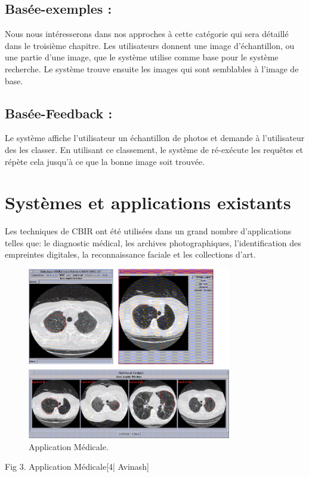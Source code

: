 \subsection{Basée-exemples :} Nous nous intéresserons dans nos approches à cette catégorie qui sera détaillé dans le troisième chapitre. Les utilisateurs donnent une image d'échantillon, ou une partie d'une image, que le système utilise comme base pour le système recherche. Le système trouve ensuite les images qui sont semblables à l'image de base.

\subsection{Basée-Feedback :} Le système affiche l'utilisateur un échantillon de photos et demande à l'utilisateur des les classer. En utilisant ce classement, le système de ré-exécute les requêtes et répète cela jusqu'à ce que la bonne image soit trouvée.

\section{Systèmes et applications existants}


	Les techniques de CBIR ont été utilisées dans un grand nombre d'applications telles que: le diagnostic médical, les archives photographiques, l'identification des empreintes digitales, la reconnaissance faciale et les collections d'art.


\begin{figure}[H]
	\centering
		\includegraphics[width=3.5in]{Figures/cbirMedic.jpg}
	\caption[An Electron]{Application Médicale.}
	\label{fig:Electron}
\end{figure}


Fig 3. Application Médicale[4| Avinash]

